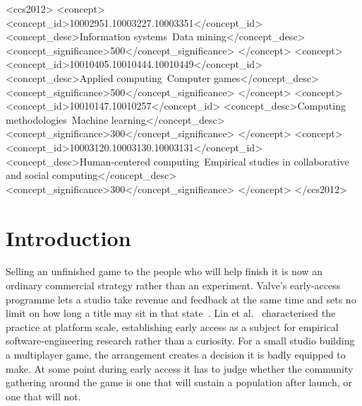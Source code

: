 \documentclass[sigconf]{acmart}
\begin{document}
\begin{CCSXML}
<ccs2012>
<concept>
<concept_id>10002951.10003227.10003351</concept_id>
<concept_desc>Information systems~Data mining</concept_desc>
<concept_significance>500</concept_significance>
</concept>
<concept>
<concept_id>10010405.10010444.10010449</concept_id>
<concept_desc>Applied computing~Computer games</concept_desc>
<concept_significance>500</concept_significance>
</concept>
<concept>
<concept_id>10010147.10010257</concept_id>
<concept_desc>Computing methodologies~Machine learning</concept_desc>
<concept_significance>300</concept_significance>
</concept>
<concept>
<concept_id>10003120.10003130.10003131</concept_id>
<concept_desc>Human-centered computing~Empirical studies in collaborative and social computing</concept_desc>
<concept_significance>300</concept_significance>
</concept>
</ccs2012>
\end{CCSXML}



\maketitle

\section{Introduction}
\label{sec:intro}

Selling an unfinished game to the people who will help finish it is now an ordinary commercial
strategy rather than an experiment. Valve's early-access programme lets a studio take revenue and
feedback at the same time and sets no limit on how long a title may sit in that
state~\cite{ValveEarlyAccess}. Lin et al.~\cite{LinBezemerHassan2018} characterised the practice at
platform scale, establishing early access as a subject for empirical software-engineering research
rather than a curiosity. For a small studio building a multiplayer game, the arrangement creates a
decision it is badly equipped to make. At some point during early access it has to judge whether
the community gathering around the game is one that will sustain a population after launch, or one
that will not.
\end{document}
